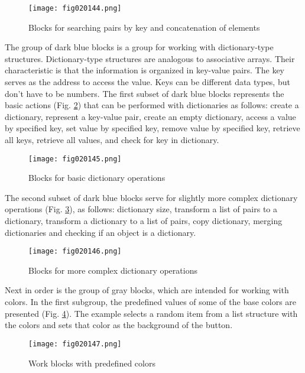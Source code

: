 \begin{figure}[H]
   \centering
   \texttt{[image: fig020144.png]}
   \caption{Blocks for searching pairs by key and concatenation of elements}
\label{fig020144}
\end{figure}

The group of dark blue blocks is a group for working with dictionary-type structures. Dictionary-type structures are analogous to associative arrays. Their characteristic is that the information is organized in key-value pairs. The key serves as the address to access the value. Keys can be different data types, but don't have to be numbers. The first subset of dark blue blocks represents the basic actions (Fig. \ref{fig020145}) that can be performed with dictionaries as follows: create a dictionary, represent a key-value pair, create an empty dictionary, access a value by specified key, set value by specified key, remove value by specified key, retrieve all keys, retrieve all values, and check for key in dictionary.

\begin{figure}[H]
   \centering
   \texttt{[image: fig020145.png]}
   \caption{Blocks for basic dictionary operations}
\label{fig020145}
\end{figure}

The second subset of dark blue blocks serve for slightly more complex dictionary operations (Fig. \ref{fig020146}), as follows: dictionary size, transform a list of pairs to a dictionary, transform a dictionary to a list of pairs, copy dictionary, merging dictionaries and checking if an object is a dictionary.

\begin{figure}[H]
   \centering
   \texttt{[image: fig020146.png]}
   \caption{Blocks for more complex dictionary operations}
\label{fig020146}
\end{figure}

Next in order is the group of gray blocks, which are intended for working with colors. In the first subgroup, the predefined values of some of the base colors are presented (Fig. \ref{fig020147}). The example selects a random item from a list structure with the colors and sets that color as the background of the button.

\begin{figure}[H]
   \centering
   \texttt{[image: fig020147.png]}
   \caption{Work blocks with predefined colors}
\label{fig020147}
\end{figure}


